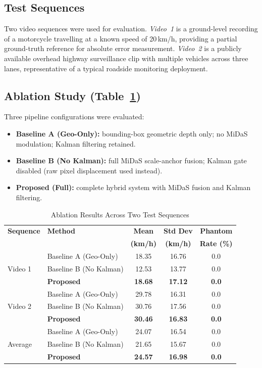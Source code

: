 \documentclass[conference]{IEEEtran}
\begin{document}
\subsection{Test Sequences}
Two video sequences were used for evaluation.
\textit{Video~1} is a ground-level recording of a motorcycle
travelling at a known speed of 20\,km/h, providing a partial
ground-truth reference for absolute error measurement.
\textit{Video~2} is a publicly available overhead highway
surveillance clip with multiple vehicles across three lanes,
representative of a typical roadside monitoring deployment.

\subsection{Ablation Study (Table~\ref{tab:ablation})}
Three pipeline configurations were evaluated:
\begin{itemize}
  \item \textbf{Baseline A (Geo-Only):} bounding-box
        geometric depth only; no MiDaS modulation; Kalman
        filtering retained.
  \item \textbf{Baseline B (No Kalman):} full MiDaS
        scale-anchor fusion; Kalman gate disabled (raw pixel
        displacement used instead).
  \item \textbf{Proposed (Full):} complete hybrid system
        with MiDaS fusion and Kalman filtering.
\end{itemize}

\begin{table}[t]
\caption{Ablation Results Across Two Test Sequences}
\label{tab:ablation}
\centering
\renewcommand{\arraystretch}{1.2}
\begin{tabular}{llccc}
\toprule
\textbf{Sequence} & \textbf{Method} &
\textbf{Mean} & \textbf{Std Dev} & \textbf{Phantom} \\
 & & \textbf{(km/h)} & \textbf{(km/h)} & \textbf{Rate (\%)} \\
\midrule
\multirow{3}{*}{Video 1}
  & Baseline A (Geo-Only) & 18.35 & 16.76 & 0.0 \\
  & Baseline B (No Kalman)& 12.53 & 13.77 & 0.0 \\
  & \textbf{Proposed}     & \textbf{18.68} & \textbf{17.12} & \textbf{0.0} \\
\midrule
\multirow{3}{*}{Video 2}
  & Baseline A (Geo-Only) & 29.78 & 16.31 & 0.0 \\
  & Baseline B (No Kalman)& 30.76 & 17.56 & 0.0 \\
  & \textbf{Proposed}     & \textbf{30.46} & \textbf{16.83} & \textbf{0.0} \\
\midrule
\multirow{3}{*}{Average}
  & Baseline A (Geo-Only) & 24.07 & 16.54 & 0.0 \\
  & Baseline B (No Kalman)& 21.65 & 15.67 & 0.0 \\
  & \textbf{Proposed}     & \textbf{24.57} & \textbf{16.98} & \textbf{0.0} \\
\bottomrule
\end{tabular}
\end{table}
\end{document}
